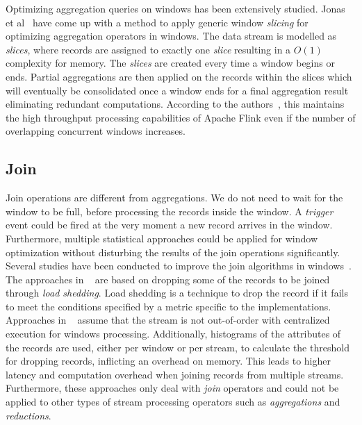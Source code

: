 Optimizing aggregation queries 
on windows has been extensively studied. Jonas et al~\cite{scotty, jonas_scotty} have come up with a method to 
apply generic window \emph{slicing} for optimizing aggregation operators in windows. 
The data stream is modelled as \emph{slices}, where 
records are assigned to exactly one \emph{slice} resulting in a 
$O(1)$ complexity for memory. The \emph{slices} are created every time a 
window begins or ends. Partial aggregations are then applied on the 
records within the slices which will eventually be consolidated once 
a window ends for a final aggregation result eliminating redundant 
computations. According to the authors~\cite{jonas_scotty}, this maintains 
the high throughput processing capabilities of Apache Flink even if the 
number of overlapping concurrent windows increases. 


\subsection{Join}%
\label{sub:Join}

Join operations are different from aggregations. We do not need 
to wait for the window to be full, before processing the records inside the 
window. A \emph{trigger} event could be fired at the very moment a new 
record arrives in the window. Furthermore, multiple statistical approaches 
could be applied for window optimization without disturbing the results 
of the join operations significantly. Several studies have been conducted to 
improve the join algorithms in windows~\cite{vctw_join, join_tracking, grubjoin, approximate_window_sem, approx_window}. 
The approaches in ~\cite{grubjoin, approximate_window_sem, approx_window} are based 
on dropping some of the records to be joined through \emph{load shedding}. 
Load shedding is a technique to drop the record if 
it fails to meet the conditions specified 
by a metric specific to the implementations. Approaches in ~\cite{grubjoin, approximate_window_sem, approx_window}
assume that the stream is not out-of-order with centralized execution for 
windows processing. Additionally, histograms of the attributes of the records are used, 
either per window or per stream, 
to calculate the threshold for dropping records, inflicting an overhead on memory. 
This leads to higher latency and computation overhead 
when joining records from multiple streams. Furthermore, 
these approaches only deal with \emph{join} operators and could not be applied to other 
types of stream processing operators such as \emph{aggregations} and \emph{reductions}.


